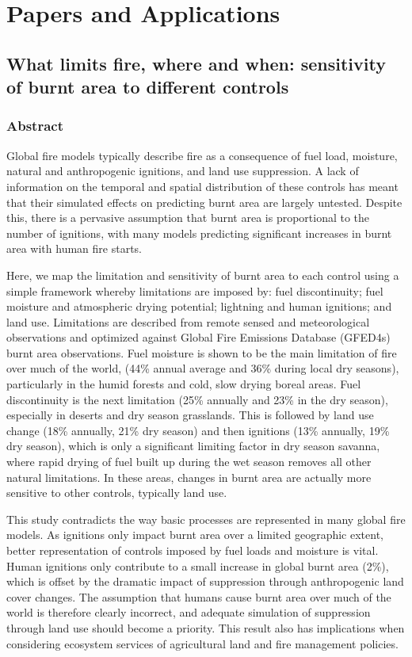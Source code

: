 \section{Papers and Applications}

\subsection{What limits fire, where and when: sensitivity of burnt area to different controls}

\subsubsection{Abstract}
Global fire models typically describe fire as a consequence of fuel load, moisture, natural and anthropogenic
ignitions, and land use suppression. A lack of information on the temporal and spatial distribution of these
controls has meant that their simulated effects on predicting burnt area are largely untested. Despite this,
there is a pervasive assumption that burnt area is proportional to the number of ignitions, with many models
predicting significant increases in burnt area with human fire starts.


Here, we map the limitation and sensitivity of burnt area to each control using a simple framework whereby
limitations are imposed by: fuel discontinuity; fuel moisture and atmospheric drying potential; lightning and
human ignitions; and land use. Limitations are described from remote sensed and meteorological
observations and optimized against Global Fire Emissions Database (GFED4s) burnt area observations.
Fuel moisture is shown to be the main limitation of fire over much of the world, (44\% annual average and
36\% during local dry seasons), particularly in the humid forests and cold, slow drying boreal areas. Fuel
discontinuity is the next limitation (25\% annually and 23\% in the dry season), especially in deserts and dry
season grasslands. This is followed by land use change (18\% annually, 21\% dry season) and then ignitions
(13\% annually, 19\% dry season), which is only a significant limiting factor in dry season savanna, where
rapid drying of fuel built up during the wet season removes all other natural limitations. In these areas,
changes in burnt area are actually more sensitive to other controls, typically land use.


This study contradicts the way basic processes are represented in many global fire models. As ignitions only
impact burnt area over a limited geographic extent, better representation of controls imposed by fuel loads
and moisture is vital. Human ignitions only contribute to a small increase in global burnt area (2\%), which is
offset by the dramatic impact of suppression through anthropogenic land cover changes. The assumption
that humans cause burnt area over much of the world is therefore clearly incorrect, and adequate simulation
of suppression through land use should become a priority. This result also has implications when considering
ecosystem services of agricultural land and fire management policies.

